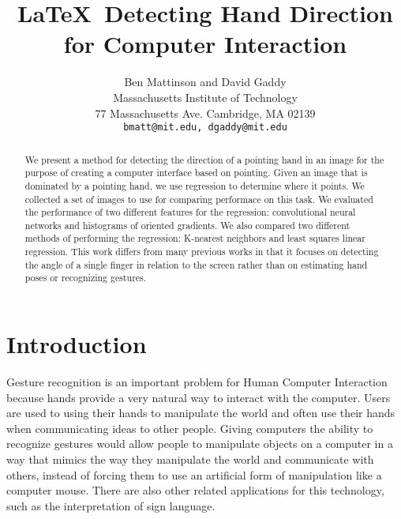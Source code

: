 \documentclass[10pt,twocolumn,letterpaper]{article}
\begin{document}
\title{\LaTeX\ Detecting Hand Direction for Computer Interaction}

\author{Ben Mattinson and David Gaddy\\
Massachusetts Institute of Technology\\
77 Massachusetts Ave. Cambridge, MA 02139\\
{\tt\small bmatt@mit.edu, dgaddy@mit.edu}
}

\maketitle

\begin{abstract}
We present a method for detecting the direction of a pointing hand in an image for the purpose of creating a computer interface based on pointing.  Given an image that is dominated by a pointing hand, we use regression to determine where it points.  We collected a set of images to use for comparing performace on this task.  We evaluated the performance of two different features for the regression: convolutional neural networks and histograms of oriented gradients.  We also compared two different methods of performing the regression: K-nearest neighbors and least squares linear regression.  This work differs from many previous works in that it focuses on detecting the angle of a single finger in relation to the screen rather than on estimating hand poses or recognizing gestures.

\end{abstract}

\section{Introduction}

Gesture recognition is an important problem for Human Computer Interaction because hands provide a very natural way to interact with the computer. Users are used to using their hands to manipulate the world and often use their hands when communicating ideas to other people. Giving computers the ability to recognize gestures would allow people to manipulate objects on a computer in a way that mimics the way they manipulate the world and communicate with others, instead of forcing them to use an artificial form of manipulation like a computer mouse. There are also other related applications for this technology, such as the interpretation of sign language.
\end{document}
